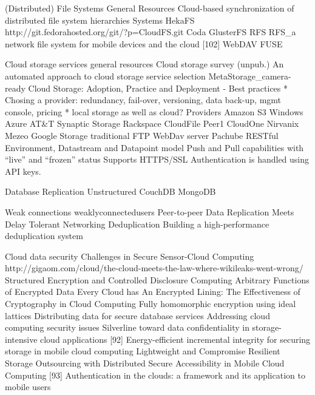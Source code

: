 	(Distributed) File Systems
		General Resources
			Cloud-based synchronization of distributed file system hierarchies
		Systems
			HekaFS
			http://git.fedorahosted.org/git/?p=CloudFS.git 
			Coda
			GlusterFS
			RFS
				RFS_a network file system for mobile devices and the cloud [102]
		WebDAV 
		FUSE		

	Cloud storage services
		general resources
			Cloud storage survey (unpub.)
			An automated approach to cloud storage service selection
			MetaStorage_camera-ready
			Cloud Storage: Adoption, Practice and Deployment
				- Best practices
					* Chosing a provider: redundancy, fail-over, versioning, data back-up, mgmt console, pricing
					* local storage as well as cloud?
		Providers
			Amazon S3
			Windows Azure
			AT&T Synaptic Storage
			Rackspace CloudFile
			Peer1 CloudOne
			Nirvanix
			Mezeo
			Google Storage
			traditional FTP
			WebDav server
			Pachube
				RESTful
				Environment, Datastream and Datapoint model
				Push and Pull capabilities with ``live'' and ``frozen'' status
				Supports HTTPS/SSL
				Authentication is handled using API keys.


	Database Replication
		Unstructured
			CouchDB
			MongoDB

	Weak connections
		weaklyconnectedusers
		Peer-to-peer Data Replication Meets Delay Tolerant Networking
	Deduplication
		Building a high-performance deduplication system
	
	Cloud data security
		Challenges in Secure Sensor-Cloud Computing
		http://gigaom.com/cloud/the-cloud-meets-the-law-where-wikileaks-went-wrong/
		Structured Encryption and Controlled Disclosure
		Computing Arbitrary Functions of Encrypted Data
		Every Cloud has An Encrypted Lining: The Effectiveness of Cryptography in Cloud Computing	
		Fully homomorphic encryption using ideal lattices
		Distributing data for secure database services
		Addressing cloud computing security issues
		Silverline toward data confidentiality in storage-intensive cloud applications
		[92] Energy-efficient incremental integrity for securing storage in mobile cloud computing
		Lightweight and Compromise Resilient Storage Outsourcing with Distributed Secure Accessibility in Mobile Cloud Computing
		[93] Authentication in the clouds: a framework and its application to mobile users